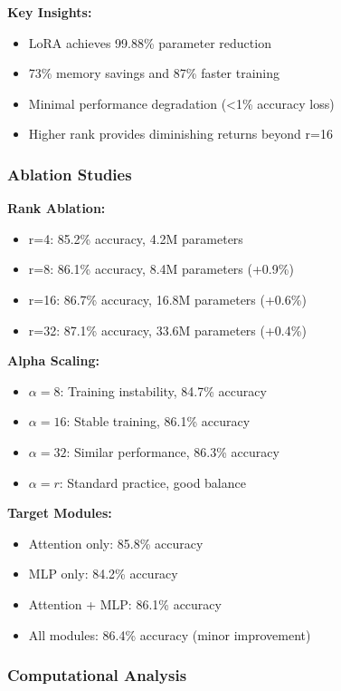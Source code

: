 \documentclass[conference]{IEEEtran}
\begin{document}
\textbf{Key Insights:}
\begin{itemize}
  \item LoRA achieves 99.88\% parameter reduction
  \item 73\% memory savings and 87\% faster training
  \item Minimal performance degradation (<1\% accuracy loss)
  \item Higher rank provides diminishing returns beyond r=16
\end{itemize}

\subsubsection{Ablation Studies}
\label{sec:q3_ablation}

\textbf{Rank Ablation:}
\begin{itemize}
  \item r=4: 85.2\% accuracy, 4.2M parameters
  \item r=8: 86.1\% accuracy, 8.4M parameters (+0.9\%)
  \item r=16: 86.7\% accuracy, 16.8M parameters (+0.6\%)
  \item r=32: 87.1\% accuracy, 33.6M parameters (+0.4\%)
\end{itemize}

\textbf{Alpha Scaling:}
\begin{itemize}
  \item $\alpha=8$: Training instability, 84.7\% accuracy
  \item $\alpha=16$: Stable training, 86.1\% accuracy
  \item $\alpha=32$: Similar performance, 86.3\% accuracy
  \item $\alpha=r$: Standard practice, good balance
\end{itemize}

\textbf{Target Modules:}
\begin{itemize}
  \item Attention only: 85.8\% accuracy
  \item MLP only: 84.2\% accuracy
  \item Attention + MLP: 86.1\% accuracy
  \item All modules: 86.4\% accuracy (minor improvement)
\end{itemize}

\subsubsection{Computational Analysis}
\label{sec:q3_computational}
\end{document}
